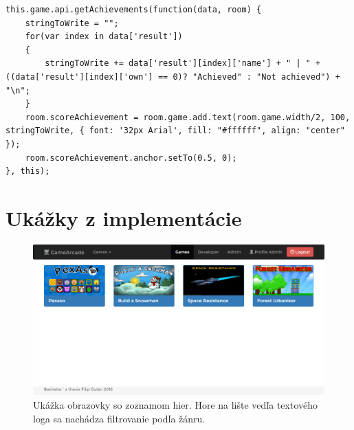 \begin{lstlisting}[]
this.game.api.getAchievements(function(data, room) {
    stringToWrite = "";
    for(var index in data['result'])
    {
        stringToWrite += data['result'][index]['name'] + " | " + ((data['result'][index]['own'] == 0)? "Achieved" : "Not achieved") + "\n";
    }
    room.scoreAchievement = room.game.add.text(room.game.width/2, 100, stringToWrite, { font: '32px Arial', fill: "#ffffff", align: "center" });
    room.scoreAchievement.anchor.setTo(0.5, 0);
}, this);
\end{lstlisting}


\chapter{Ukážky z implementácie}
\begin{figure}[h]
  \centering
  \includegraphics[scale=0.35]{fig/ukazka-zoznam-hier.png}
  \caption{Ukážka obrazovky so zoznamom hier. Hore na lište vedľa textového loga sa nachádza filtrovanie podľa žánru.}
  \label{fig:ukazka-zoznamhier}
\end{figure}

